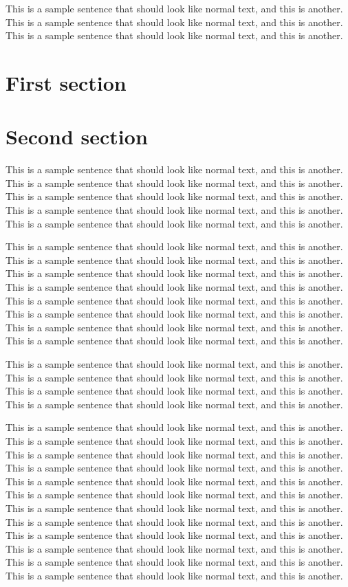 
This is a sample sentence that should look like normal text, and this
is another. This is a sample sentence that should look like normal
text, and this is another. This is a sample sentence that should look
like normal text, and this is another.


\section{First section}


\section{Second section}

This is a sample sentence that should look like normal text, and this
is another. This is a sample sentence that should look like normal
text, and this is another. This is a sample sentence that should look
like normal text, and this is another. This is a sample sentence that
should look like normal text, and this is another. This is a sample
sentence that should look like normal text, and this is another.

This is a sample sentence that should look like normal text, and this
is another. This is a sample sentence that should look like normal
text, and this is another. This is a sample sentence that should look
like normal text, and this is another. This is a sample sentence that
should look like normal text, and this is another. This is a sample
sentence that should look like normal text, and this is another. This
is a sample sentence that should look like normal text, and this is
another. This is a sample sentence that should look like normal text,
and this is another. This is a sample sentence that should look like
normal text, and this is another.

This is a sample sentence that should look like normal text, and this
is another. This is a sample sentence that should look like normal
text, and this is another. This is a sample sentence that should look
like normal text, and this is another. This is a sample sentence that
should look like normal text, and this is another.

This is a sample sentence that should look like normal text, and this
is another. This is a sample sentence that should look like normal
text, and this is another. This is a sample sentence that should look
like normal text, and this is another. This is a sample sentence that
should look like normal text, and this is another. This is a sample
sentence that should look like normal text, and this is another. This
is a sample sentence that should look like normal text, and this is
another. This is a sample sentence that should look like normal text,
and this is another. This is a sample sentence that should look like
normal text, and this is another. This is a sample sentence that
should look like normal text, and this is another. This is a sample
sentence that should look like normal text, and this is another. This
is a sample sentence that should look like normal text, and this is
another. This is a sample sentence that should look like normal text,
and this is another.

